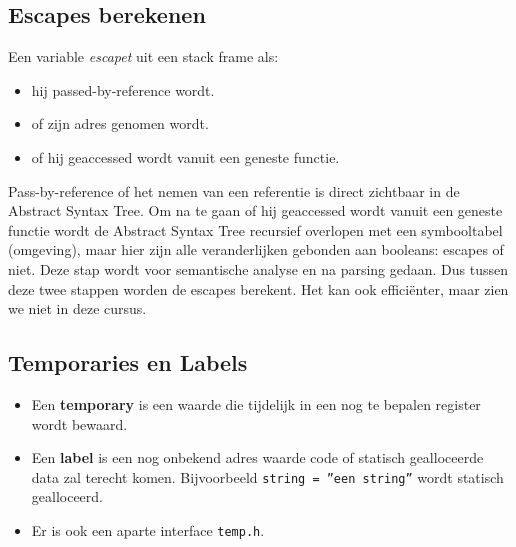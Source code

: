  \subsection{Escapes berekenen}
 Een variable \textit{escapet} uit een stack frame als:
 \begin{itemize}
 	\item hij passed-by-reference wordt.
 	\item of zijn adres genomen wordt.
 	\item of hij geaccessed wordt vanuit een geneste functie.
 \end{itemize}
 Pass-by-reference of het nemen van een referentie is direct zichtbaar in de Abstract Syntax Tree. Om na te gaan of hij geaccessed wordt vanuit een geneste functie wordt de Abstract Syntax Tree recursief overlopen met een symbooltabel (omgeving), maar hier zijn alle veranderlijken gebonden aan booleans: escapes of niet. Deze stap wordt voor semantische analyse en na parsing gedaan. Dus tussen deze twee stappen worden de escapes berekent. Het kan ook efficiënter, maar zien we niet in deze cursus.
 
\subsection{Temporaries en Labels}
\begin{itemize}
	\item Een \textbf{temporary} is een waarde die tijdelijk in een nog te bepalen register wordt bewaard.
	\item Een \textbf{label} is een nog onbekend adres waarde code of statisch gealloceerde data zal terecht komen. Bijvoorbeeld \texttt{string = \textquotedblright een string\textquotedblright} wordt statisch gealloceerd.
	\item Er is ook een aparte interface \texttt{temp.h}.
\end{itemize} 
